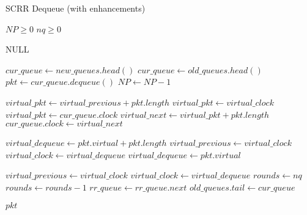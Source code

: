 \begin{algorithm}[th!]
\caption{SCRR Dequeue (with enhancements)}
\label{alg:scrr-neia-deq}
\begin{algorithmic}
\Require $NP \ge 0$
\Require $nq \ge 0$

\Return NULL
\EndIf

\State $cur\_queue \gets new\_queues.head()$
\State $cur\_queue \gets old\_queues.head()$
\EndIf
\State $pkt \gets cur\_queue.dequeue()$
\State $NP \gets NP - 1$

\State $virtual\_pkt \gets virtual\_previous + pkt.length$
\Else
\State $virtual\_pkt \gets virtual\_clock$
\EndIf
\Else
\State $virtual\_pkt \gets cur\_queue.clock$
\EndIf
\State $virtual\_next \gets virtual\_pkt + pkt.length$
\State $cur\_queue.clock \gets virtual\_next$


\State $virtual\_dequeue \gets pkt.virtual + pkt.length$
\State $virtual\_previous \gets virtual\_clock$
\State $virtual\_clock \gets virtual\_dequeue$
\State $virtual\_dequeue \gets pkt.virtual$
\EndIf

\State $virtual\_previous \gets virtual\_clock$
\State $virtual\_clock \gets virtual\_dequeue$
\State $rounds \gets nq$
\EndIf
\State $rounds \gets rounds - 1$
\State $rr\_queue \gets rr\_queue.next$
\State $old\_queues.tail \gets cur\_queue$
\EndIf
\EndIf

\Return $pkt$
\EndFunction
\end{algorithmic}
\end{algorithm}

\vspace{3mm}
